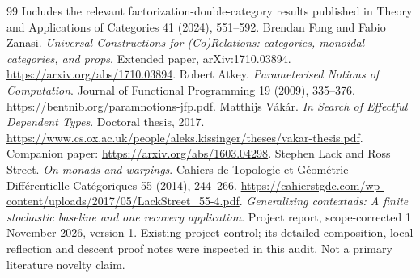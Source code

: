 \documentclass[11pt,a4paper]{article}
\begin{document}
\begin{thebibliography}{99}
Includes the relevant factorization-double-category results published in
Theory and Applications of Categories 41 (2024), 551--592.
 Brendan Fong and Fabio Zanasi.
\emph{Universal Constructions for (Co)Relations: categories, monoidal categories, and props}.
Extended paper, arXiv:1710.03894.
\url{https://arxiv.org/abs/1710.03894}.
 Robert Atkey. \emph{Parameterised Notions of Computation}.
Journal of Functional Programming 19 (2009), 335--376.
\url{https://bentnib.org/paramnotions-jfp.pdf}.
 Matthijs V\'ak\'ar. \emph{In Search of Effectful Dependent Types}.
Doctoral thesis, 2017.
\url{https://www.cs.ox.ac.uk/people/aleks.kissinger/theses/vakar-thesis.pdf}.
Companion paper: \url{https://arxiv.org/abs/1603.04298}.
 Stephen Lack and Ross Street. \emph{On monads and warpings}.
Cahiers de Topologie et G\'eom\'etrie Diff\'erentielle Cat\'egoriques
55 (2014), 244--266.
\url{https://cahierstgdc.com/wp-content/uploads/2017/05/LackStreet_55-4.pdf}.
 \emph{Generalizing contextads: A finite stochastic baseline and one recovery application}.
Project report, scope-corrected 1 November 2026, version 1.
Existing project control; its detailed composition, local reflection and descent
proof notes were inspected in this audit. Not a primary literature novelty claim.
\end{thebibliography}
\end{document}
